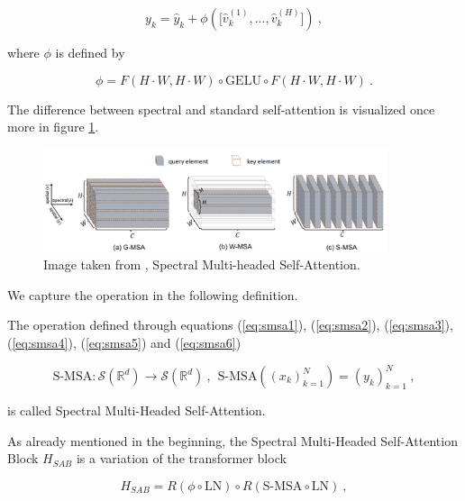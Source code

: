     \begin{equation} \label{eq:smsa6}
        y_k = \hat{y}_k + \phi \left( \big[\hat{v}_k^{(1)}, ..., \hat{v}_k^{(H)}] \right) ~,
    \end{equation}

where $\phi$ is defined by

    \begin{equation*}
        \phi = F(H \cdot W, H \cdot W) \circ \text{GELU} \circ F(H \cdot W, H \cdot W) ~.
    \end{equation*}

The difference between spectral and standard self-attention is visualized once more in figure \ref{fig:smsa}.

\begin{figure}[h!]
    \includegraphics[width=0.9\textwidth]{models/ssr/imgs/smsa.png}
    \caption{Image taken from \cite{caiMSTMultistageSpectralwise2022a}, Spectral Multi-headed Self-Attention.}
    \label{fig:smsa}
\end{figure}

We capture the operation in the following definition.

\begin{definition}
    The operation defined through equations (\ref{eq:smsa1}), (\ref{eq:smsa2}), (\ref{eq:smsa3}), (\ref{eq:smsa4}), (\ref{eq:smsa5}) and (\ref{eq:smsa6})

        \begin{equation*}
            \text{S-MSA} : \mathcal{S}( \mathbb{R}^d) \to \mathcal{S}( \mathbb{R}^d) ~, ~~ \text{S-MSA} \left( (x_k)_{k = 1}^N \right) = (y_k)_{k = 1}^N ~,
        \end{equation*}

    is called Spectral Multi-Headed Self-Attention.
\end{definition}

As already mentioned in the beginning, the Spectral Multi-Headed Self-Attention Block $H_{SAB}$ is a variation of the transformer block

\begin{equation*}
    H_{SAB} = R( \phi \circ \text{LN} ) \circ R( \text{S-MSA} \circ \text{LN} ) ~,
\end{equation*}

